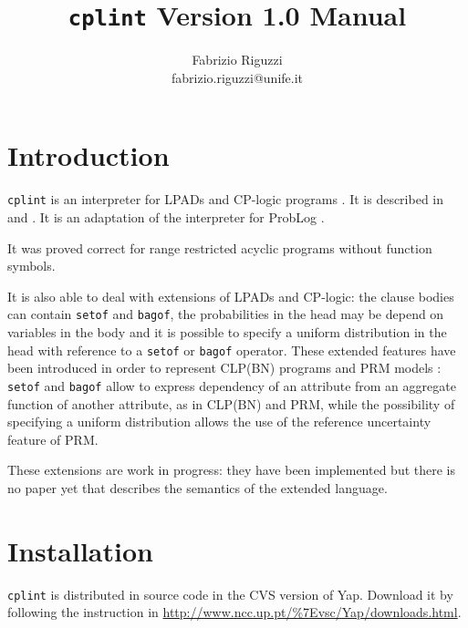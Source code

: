 \documentclass[a4paper,12pt]{article}
\begin{document}
\title{\texttt{cplint} Version 1.0 Manual}


\author{Fabrizio Riguzzi\\
fabrizio.riguzzi@unife.it}

\maketitle


\section{Introduction}


\texttt{cplint} is an interpreter for LPADs \cite{VenVer03-TR,VenVer04-ICLP04-IC} and CP-logic programs \cite{VenDenBru-JELIA06,CP-logic-unp}. It is described in \cite{Rig-AIIA07-IC} and \cite{Rig-RCRA07-IC}. It is an adaptation of the interpreter for ProbLog \cite{DBLP:conf/ijcai/RaedtKT07}.

It was proved correct \cite{Rig-RCRA07-IC} for range restricted acyclic programs \cite{DBLP:journals/ngc/AptB91} without function symbols.

It is also able to deal with extensions of LPADs and CP-logic: the clause bodies can contain \texttt{setof} and \texttt{bagof}, the probabilities in the head may be depend on variables in the body and it is possible to specify a uniform distribution in the head with reference to a \texttt{setof} or \texttt{bagof} operator. These extended features have been introduced in order to represent CLP(BN) \cite{SanPagQaz03-UAI-IC} programs and PRM models \cite{Getoor+al:JMLR02}:
\texttt{setof} and \texttt{bagof} allow to express dependency of an attribute from an aggregate function of another attribute, as in CLP(BN)  and PRM, while the possibility of specifying a uniform distribution allows the use of the reference uncertainty feature of PRM.

These extensions are work in progress: they have been implemented but there is no paper yet that describes the semantics of the extended language. 


\section{Installation}
\texttt{cplint} is distributed in source code in the CVS version of Yap. Download it by following the instruction in \href{http://www.ncc.up.pt/\%7Evsc/Yap/downloads.html}{http://www.ncc.up.pt/\%7Evsc/Yap/downloads.html}.
\end{document}
